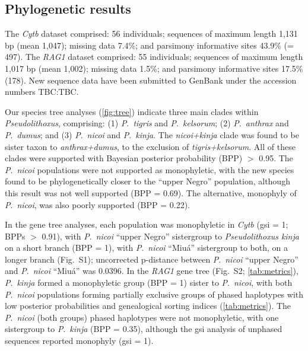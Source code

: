 \documentclass[12pt]{article}
\begin{document}
\subsection*{Phylogenetic results}

The \emph{Cytb} dataset comprised: 56 individuals; sequences of maximum length 1,131 bp (mean 1,047); missing data 7.4\%; and parsimony informative sites 43.9\% (= 497). %
The \emph{RAG1} dataset comprised: 55 individuals; sequences of maximum length 1,017 bp (mean 1,002); missing data 1.5\%; and parsimony informative sites 17.5\% (178). %
New sequence data have been submitted to GenBank under the accession numbers TBC:TBC.

Our species tree analyses (\autoref{fig:tree}) indicate three main clades within \emph{Pseudolithoxus}, comprising: (1) \emph{P}.\ \emph{tigris} and \emph{P}.\ \emph{kelsorum}; (2) \emph{P}.\ \emph{anthrax} and \emph{P}.\ \emph{dumus}; and (3) \emph{P}.\ \emph{nicoi} and \emph{P}.\ \emph{kinja}. %
The \emph{nicoi+kinja} clade was found to be sister taxon to \emph{anthrax+dumus}, to the exclusion of \emph{tigris+kelsorum}. All of these clades were supported with Bayesian posterior probability (BPP) $>$ 0.95. %
The \emph{P}.\ \emph{nicoi} populations were not supported as monophyletic, with the new species found to be phylogenetically closer to the ``upper Negro'' population, although this result was not well supported (BPP = 0.69). %
The alternative, monophyly of \emph{P}.\ \emph{nicoi}, was also poorly supported (BPP = 0.22).%

In the gene tree analyses, each population was monophyletic in \emph{Cytb} (gsi = 1; BPPs $>$ 0.91), with \emph{P}.\ \emph{nicoi} ``upper Negro'' sistergroup to \emph{Pseudolithoxus kinja} on a short branch (BPP = 1), with \emph{P}.\ \emph{nicoi} ``Miuá'' sistergroup to both, on a longer branch (Fig.\ S1); uncorrected p-distance between \emph{P}.\ \emph{nicoi} ``upper Negro'' and \emph{P}.\ \emph{nicoi} ``Miuá'' was 0.0396. %
In the \emph{RAG1} gene tree (Fig.\ S2; \autoref{tab:metrics}), \emph{P}.\ \emph{kinja} formed a monophyletic group (BPP = 1) sister to \emph{P}.\ \emph{nicoi}, with both \emph{P}.\ \emph{nicoi} populations forming partially exclusive groups of phased haplotypes with low posterior probabilities and genealogical sorting indices (\autoref{tab:metrics}). %
The \emph{P}.\ \emph{nicoi} (both groups) phased haplotypes were not monophyletic, with one sistergroup to \emph{P}.\ \emph{kinja} (BPP = 0.35), although the gsi analysis of unphased sequences reported monophyly (gsi = 1).%
\end{document}

